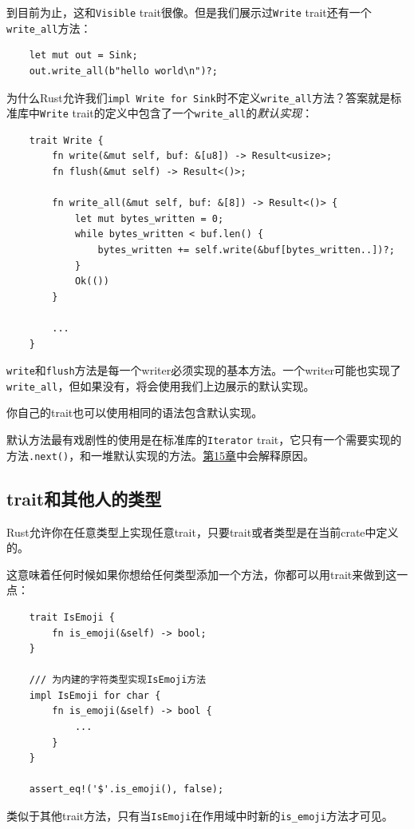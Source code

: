 到目前为止，这和\texttt{Visible} trait很像。但是我们展示过\texttt{Write} trait还有一个\texttt{write\_all}方法：
\begin{verbatim}
    let mut out = Sink;
    out.write_all(b"hello world\n")?;
\end{verbatim}

为什么Rust允许我们\texttt{impl Write for Sink}时不定义\texttt{write\_all}方法？答案就是标准库中\texttt{Write} trait的定义中包含了一个\texttt{write\_all}的\emph{默认实现}：
\begin{verbatim}
    trait Write {
        fn write(&mut self, buf: &[u8]) -> Result<usize>;
        fn flush(&mut self) -> Result<()>;
        
        fn write_all(&mut self, buf: &[8]) -> Result<()> {
            let mut bytes_written = 0;
            while bytes_written < buf.len() {
                bytes_written += self.write(&buf[bytes_written..])?;
            }
            Ok(())            
        }

        ...
    }
\end{verbatim}

\texttt{write}和\texttt{flush}方法是每一个writer必须实现的基本方法。一个writer可能也实现了\\
\texttt{write\_all}，但如果没有，将会使用我们上边展示的默认实现。

你自己的trait也可以使用相同的语法包含默认实现。

默认方法最有戏剧性的使用是在标准库的\texttt{Iterator} trait，它只有一个需要实现的方法\texttt{.next()}，和一堆默认实现的方法。\hyperref[ch15]{第15章}中会解释原因。

\subsection{trait和其他人的类型}\label{OrphanRule}
Rust允许你在任意类型上实现任意trait，只要trait或者类型是在当前crate中定义的。

这意味着任何时候如果你想给任何类型添加一个方法，你都可以用trait来做到这一点：
\begin{verbatim}
    trait IsEmoji {
        fn is_emoji(&self) -> bool;
    }

    /// 为内建的字符类型实现IsEmoji方法
    impl IsEmoji for char {
        fn is_emoji(&self) -> bool {
            ...
        }
    }

    assert_eq!('$'.is_emoji(), false);
\end{verbatim}

类似于其他trait方法，只有当\texttt{IsEmoji}在作用域中时新的\texttt{is\_emoji}方法才可见。

